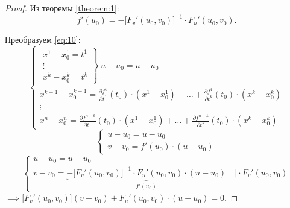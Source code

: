 \begin{proof}
    Из теоремы \ref{theorem:1}:
    \[
        f'(u_0) = -\big[F_v'(u_0,v_0)\big]^{-1} \cdot F_u'(u_0,v_0).
    \]

    Преобразуем \ref{eq:10}:
    \[
        \left\{\begin{array}{l}
            \left.\begin{array}{l}
                      x^1 - x_0^1 = t^1 \\
                      \vdots            \\
                      x^k - x_0^k = t^k
                  \end{array}\right\} \ u - u_0 = u - u_0                                                                                                \\
            x^{k+1} - x_0^{k+1} = \frac{\partial f^1}{\partial t^1}(t_0)\cdot (x^1 - x_0^1) + \ldots + \frac{\partial f^1}{\partial t^k}(t_0)\cdot (x^k - x_0^k) \\
            \vdots                                                                                                                                       \\
            x^n - x_0^n = \frac{\partial f^{n-k}}{\partial t^1}(t_0)\cdot (x^1 - x_0^1) + \ldots + \frac{\partial f^{n-k}}{\partial t^k}(t_0)\cdot (x^k - x_0^k)
        \end{array}\right.
    \]
    \[
        \left\{\begin{array}{l}
            u-u_0 = u-u_0 \\
            v-v_0 = f'(u_0) \cdot (u-u_0)
        \end{array}\right.
    \]
    \[
        \left\{\begin{array}{l}
            u-u_0 = u-u_0 \\
            v - v_0 = \underbrace{-\big[F_v'(u_0,v_0)\big]^{-1}\cdot F_u'(u_0,v_0)\cdot (u-u_0)}_{f'(u_0)} \quad \Big| \cdot F_v'(u_0,v_0)
        \end{array}\right.
    \]
    $ \implies \big[F_v'(u_0,v_0)\big](v-v_0) + F_u'(u_0,v_0)\cdot(u-u_0) = 0 $.
\end{proof}

